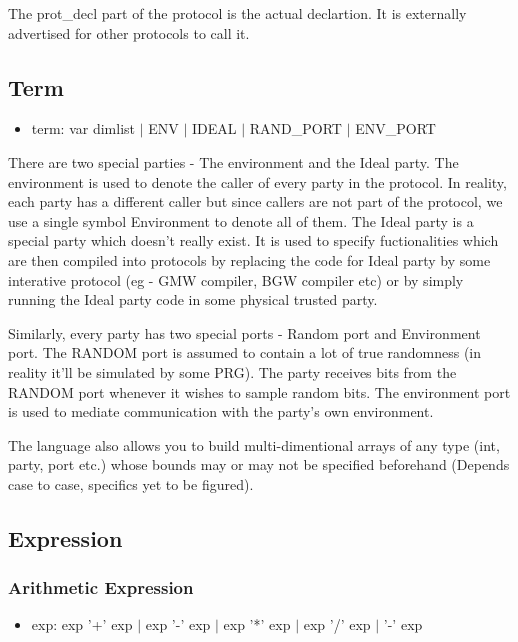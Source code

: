 \documentclass{article}
\begin{document}
The prot\_decl part of the protocol is the actual declartion. It is externally advertised for other protocols to call it.

\subsection{Term}
\begin{itemize}
\item term: var dimlist $|$ ENV $|$ IDEAL $|$ RAND\_PORT $|$ ENV\_PORT
\end{itemize}

There are two special parties - The environment and the Ideal party. The environment is used to denote the caller of every party in the protocol. In reality, each party has a different caller but since callers are not part of the protocol, we use a single symbol Environment to denote all of them. The Ideal party is a special party which doesn't really exist. It is used to specify fuctionalities which are then compiled into protocols by replacing the code for Ideal party by some interative protocol (eg - GMW compiler, BGW compiler etc) or by simply running the Ideal party code in some physical trusted party.

Similarly, every party has two special ports - Random port and Environment port. The RANDOM port is assumed to contain a lot of true randomness (in reality it'll be simulated by some PRG). The party receives bits from the RANDOM port whenever it wishes to sample random bits. The environment port is used to mediate communication with the party's own environment.

The language also allows you to build multi-dimentional arrays of any type (int, party, port etc.) whose bounds may or may not be specified beforehand (Depends case to case, specifics yet to be figured).

\subsection{Expression}

\subsubsection{Arithmetic Expression}
\begin{itemize}
\item exp: exp '+' exp $|$ exp '-' exp $|$ exp '*' exp $|$ exp '/' exp $|$ '-' exp
\end{itemize}
\end{document}
